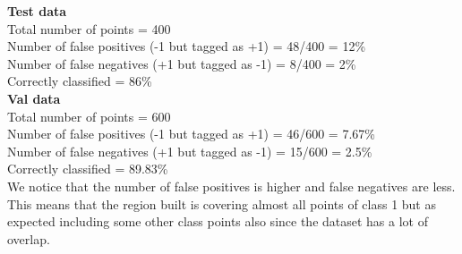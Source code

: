 \documentclass{article}
\begin{document}
\textbf{Test data\\}
Total number of points = 400 \\
Number of false positives (-1 but tagged as +1) = 48/400 = 12\%\\ 
Number of false negatives (+1 but tagged as -1) = 8/400 = 2\% \\  
Correctly classified = 86\%\\[10pt]
\textbf{Val data\\}
Total number of points = 600 \\
Number of false positives (-1 but tagged as +1) = 46/600 = 7.67\%\\ 
Number of false negatives (+1 but tagged as -1) = 15/600 = 2.5\% \\  
Correctly classified = 89.83\%\\[10pt]

We notice that the number of false positives is higher and false negatives are less. This means that the region built is covering almost all points of class 1 but as expected including some other class points also since the dataset has a lot of overlap.
\end{document}
